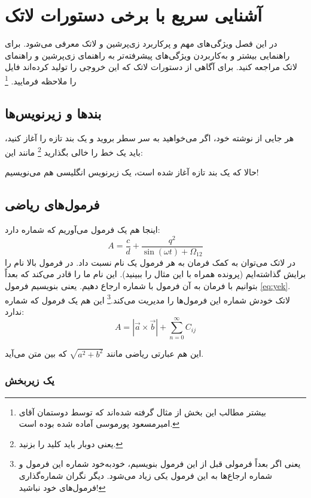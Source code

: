 \chapter{آشنایی سریع با برخی دستورات لاتک}\label{Chap:latexIntro}
در این فصل ویژگی‌های مهم و پرکاربرد زی‌پرشین و لاتک معرفی می‌شود. برای راهنمایی بیشتر و به‌کاربردن ویژگی‌های پیشرفته‌تر به راهنمای زی‌پرشین و راهنمای لاتک مراجعه کنید. برای آگاهی از دستورات لاتک که این خروجی را تولید کرده‌اند فایل  را ملاحظه فرمایید.
\footnote{بیشتر مطالب این بخش از مثال 
	گرفته شده‌اند که توسط دوستمان آقای امیرمسعود پورموسی آماده شده بوده است.}

\section{بندها و زیرنویس‌ها}
هر جایی از نوشته خود، اگر می‌خواهید به سر سطر بروید و یک بند تازه را آغاز کنید، باید یک خط را خالی بگذارید
\footnote{یعنی دوبار باید کلید  را بزنید.}
مانند این:

حالا که یک بند تازه آغاز شده است، یک زیرنویس انگلیسی
هم می‌نویسیم!
\section{فرمول‌های ریاضی}\label{formula}

اینجا هم یک فرمول می‌آوریم که شماره دارد:
\begin{equation}\label{eq:yek}
A=\frac{c}{d}+\frac{q^2}{\sin(\omega t)+\Omega_{12}}
\end{equation}
در لاتک می‌توان به کمک فرمان 
به هر فرمول یک نام نسبت داد. در فرمول بالا نام  را برایش گذاشته‌ایم (پرونده  همراه با این مثال را ببینید). این نام ما را قادر می‌کند که بعداً بتوانیم با فرمان
به آن فرمول با شماره ارجاع دهیم. یعنی بنویسیم فرمول \ref{eq:yek}. 
لاتک خودش شماره این فرمول‌ها را مدیریت می‌کند.\footnote{یعنی اگر بعداً فرمولی قبل از این فرمول بنویسیم، خودبه‌خود شماره این فرمول و شماره ارجاع‌ها به این فرمول یکی زیاد می‌شود. دیگر نگران شماره‌گذاری فرمول‌های خود نباشید!} این هم یک فرمول که شماره ندارد:
$$A=|\vec{a}\times \vec{b}| + \sum_{n=0}^\infty C_{ij}$$

این هم عبارتی ریاضی مانند 
$\sqrt{a^2+b^2}$
که بین متن می‌آید.
\subsection{یک زیربخش}\label{zirbakhsh}


